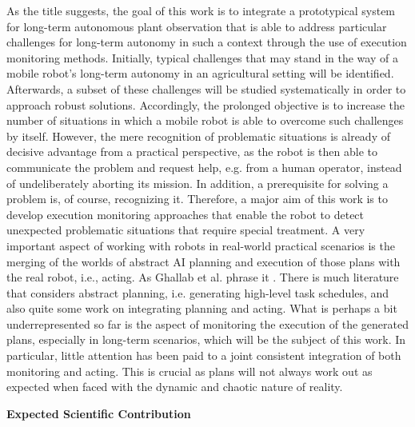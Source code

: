 \documentclass[english, master, utf8]{base/thesis_KBS}
\begin{document}
As the title suggests, the goal of this work is to integrate a prototypical system for long-term autonomous plant observation that is able to address 
particular challenges for long-term autonomy in such a context through the use of execution monitoring methods. Initially, typical challenges that may stand in the way of a mobile
robot's long-term autonomy in an agricultural setting will be identified. Afterwards, a subset of these challenges will be studied systematically in order to 
approach robust solutions. Accordingly, the prolonged objective is to increase the number of situations in which a mobile robot is able to 
overcome such challenges by itself. However, the mere recognition of problematic situations is already of decisive advantage from a practical perspective,
as the robot is then able to communicate the problem and request help, e.g. from a human operator, instead of undeliberately aborting its mission.
In addition, a prerequisite for solving a problem is, of course, recognizing it. Therefore, a major aim of this work is to develop execution monitoring
approaches that enable the robot to detect unexpected problematic situations that require special treatment.\newline
A very important aspect of working with robots in real-world practical scenarios is the merging of the worlds of abstract AI planning and execution of those plans with
the real robot, i.e., acting. As Ghallab et al. phrase it . \cite{GNT:2016} There is much literature that considers abstract planning, i.e. generating high-level
task schedules, and also quite some work on integrating planning and acting. What is perhaps a bit underrepresented so far is the aspect of monitoring the execution of the generated
plans, especially in long-term scenarios, which will be the subject of this work. In particular, little attention has been paid to a joint consistent integration of both monitoring
and acting. \cite{Ingrand:2017} This is crucial as plans will not always work out as expected when faced with the dynamic and chaotic nature of reality.\newline

\textbf{Expected Scientific Contribution}\newline
\end{document}
